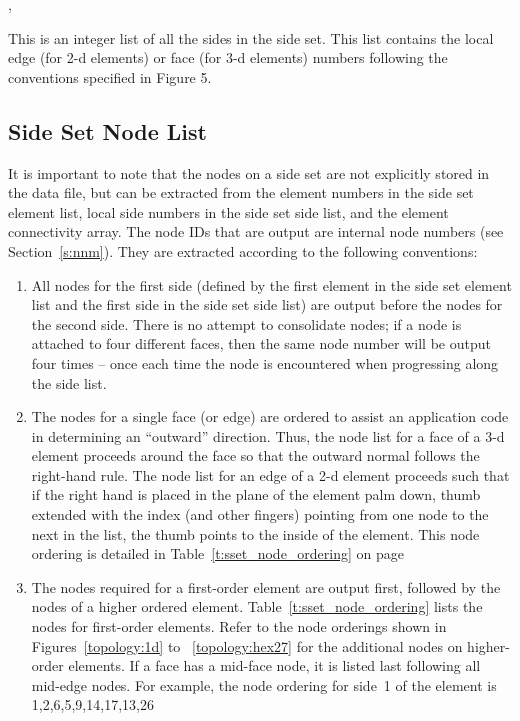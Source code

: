\begin{spacing}{1.5}
\api {}, 
\end{spacing}

{This is an integer list of all the sides in the side set.
This list contains the local edge (for 2-d elements) or face
(for 3-d elements) numbers following the conventions specified
in  Figure 5.}



\subsection{Side Set Node List}



\begin{spacing}{1.5}
\api {}
\end{spacing}

It is important to note that the nodes on a side set are
not explicitly stored in the data file, but can be extracted
from the element numbers in the side set element list, local
side numbers in the side set side list, and the element connectivity
array. The node IDs that are output are internal node numbers
(see  Section~\ref{s:nnm}). They are extracted according to
the following conventions:


\begin{enumerate}
\item {All nodes for the first side (defined by the first element
in the side set element list and the first side in the side set side
list) are output before the nodes for the second side. There is no
attempt to consolidate nodes; if a node is attached to four different
faces, then the same node number will be output four times -- once
each time the node is encountered when progressing along the side
list.}

\item {The nodes for a single face (or edge) are ordered to assist
an application code in determining an ``outward'' direction. Thus, the
node list for a face of a 3-d element proceeds around the face so that
the outward normal follows the right-hand rule. The node list for an
edge of a 2-d element proceeds such that if the right hand is placed
in the plane of the element palm down, thumb extended with the index
(and other fingers) pointing from one node to the next in the list,
the thumb points to the inside of the element. This node ordering is
detailed in Table~\ref{t:sset_node_ordering} on
page~\pageref{t:sset_node_ordering}}

\item {The nodes required for a first-order element are output
first, followed by the nodes of a higher ordered
element. Table~\ref{t:sset_node_ordering} lists the nodes for
first-order elements.  Refer to the node orderings shown in
Figures~\ref{topology:1d} to ~\ref{topology:hex27} for the additional
nodes on higher-order elements. If a face has a mid-face node, it is
listed last following all mid-edge nodes.  For example, the node
ordering for side~1 of the  element is {1,2,6,5,9,14,17,13,26}}
\end{enumerate}

